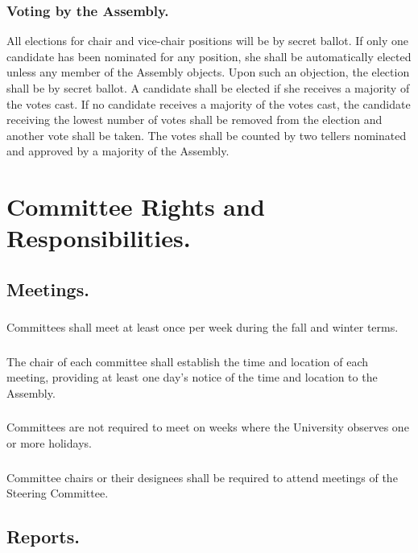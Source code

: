 \documentclass{rules}
\begin{document}
\subsubsection{Voting by the Assembly.}
\subsubsubsection{}
All elections for chair and vice-chair positions will be by secret ballot.  
\subsubsubsection{}
If only one candidate has been nominated for any position, she shall be automatically elected unless any member of the Assembly objects.  Upon such an objection, the election shall be by secret ballot.
\subsubsubsection{}
A candidate shall be elected if she receives a majority of the votes cast.
\subsubsubsection{}
If no candidate receives a majority of the votes cast, the candidate receiving the lowest number of votes shall be removed from the election and another vote shall be taken.
\subsubsubsection{}
The votes shall be counted by two tellers nominated and approved by a majority of the Assembly.

\section{Committee Rights and Responsibilities.}
\subsection{Meetings.}
\subsubsection{}
Committees shall meet at least once per week during the fall and winter terms.
\subsubsection{}
The chair of each committee shall establish the time and location of each meeting, providing at least one day's notice of the time and location to the Assembly.
\subsubsection{}
Committees are not required to meet on weeks where the University observes one or more holidays.
\subsubsection{}
Committee chairs or their designees shall be required to attend meetings of the Steering Committee.
\subsection{Reports.}
\end{document}
